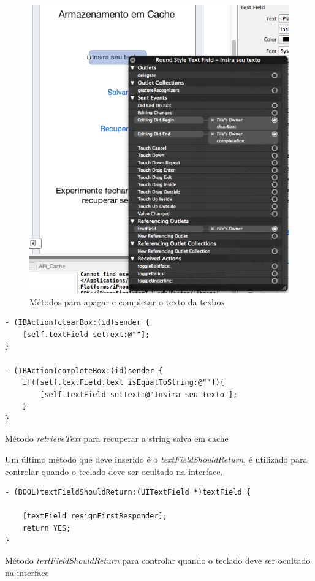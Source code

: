 \documentclass[a4paper,12pt,brazil,doubleside]{book}
\begin{document}
\begin{singlespace}
\begin{figure}[H]
  \centering
  \includegraphics[width=.75\textwidth]{figuras/4/app_cache_ibaction.png}
  \caption{Métodos para apagar e completar o texto da texbox}
  \label{fig:app_cache_ibaction}
\end{figure}

\begin{listing}[H]
\begin{verbatim}
- (IBAction)clearBox:(id)sender {
    [self.textField setText:@""];
}

- (IBAction)completeBox:(id)sender {
    if([self.textField.text isEqualToString:@""]){
        [self.textField setText:@"Insira seu texto"];
    }
}
\end{verbatim}
\caption{Método \emph{retrieveText} para recuperar a string salva em cache}
\end{listing}


Um último método que deve inserido é o \emph{textFieldShouldReturn}, é utilizado para controlar quando o teclado deve ser ocultado na interface.

\begin{listing}[H]
\begin{verbatim}
- (BOOL)textFieldShouldReturn:(UITextField *)textField {
    
    [textField resignFirstResponder];
    return YES;
}
\end{verbatim}
\caption{Método \emph{textFieldShouldReturn} para controlar quando o teclado deve ser ocultado na interface}
\end{listing}



\end{singlespace}
\end{document}
